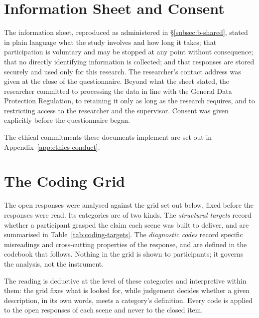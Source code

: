 \section{Information Sheet and Consent}
\label{app:b-consent}

The information sheet, reproduced as administered in \S\ref{subsec:b-shared}, stated in plain language what the study involves and how long it takes; that participation is voluntary and may be stopped at any point without consequence; that no directly identifying information is collected; and that responses are stored securely and used only for this research. The researcher's contact address was given at the close of the questionnaire. Beyond what the sheet stated, the researcher committed to processing the data in line with the General Data Protection Regulation, to retaining it only as long as the research requires, and to restricting access to the researcher and the supervisor. Consent was given explicitly before the questionnaire began.


The ethical commitments these documents implement are set out in Appendix~\ref{app:ethics-conduct}.

\section{The Coding Grid}
\label{sec:app-coding-grid}

The open responses were analysed against the grid set out below, fixed before the responses were read. Its categories are of two kinds. The \emph{structural targets} record whether a participant grasped the claim each scene was built to deliver, and are summarised in Table~\ref{tab:coding-targets}. The \emph{diagnostic codes} record specific misreadings and cross-cutting properties of the response, and are defined in the codebook that follows. Nothing in the grid is shown to participants; it governs the analysis, not the instrument.

The reading is deductive at the level of these categories and interpretive within them: the grid fixes what is looked for, while judgement decides whether a given description, in its own words, meets a category's definition. Every code is applied to the open responses of each scene and never to the closed item.


